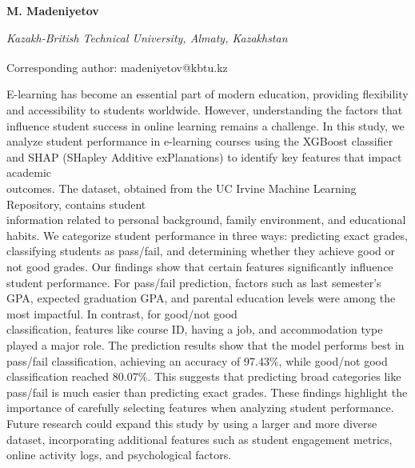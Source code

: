
\begin{articleheader}

{\bfseries
M. Madeniyetov
}
\end{articleheader}

\begin{affiliation}
\emph{Kazakh-British Technical University, Almaty, Kazakhstan}

\raggedright \textsuperscript{\envelope }Corresponding author: madeniyetov@kbtu.kz
\end{affiliation}

E-learning has become an essential part of modern education, providing
flexibility and accessibility to students worldwide. However,
understanding the factors that influence student success in online
learning remains a challenge. In this study, we analyze student
performance in e-learning courses using the XGBoost classifier and SHAP
(SHapley Additive exPlanations) to identify key features that impact
academic \\outcomes. The dataset, obtained from the UC Irvine Machine
Learning Repository, contains student \\information related to personal
background, family environment, and educational habits. We categorize
student performance in three ways: predicting exact grades, classifying
students as pass/fail, and determining whether they achieve good or not
good grades. Our findings show that certain features significantly
influence student performance. For pass/fail prediction, factors such as
last semester's GPA, expected graduation GPA, and parental education
levels were among the most impactful. In contrast, for good/not good\\
classification, features like course ID, having a job, and accommodation
type played a major role. The prediction results show that the model
performs best in pass/fail classification, achieving an accuracy of
97.43\%, while good/not good classification reached 80.07\%. This
suggests that predicting broad categories like pass/fail is much easier
than predicting exact grades. These findings highlight the importance of
carefully selecting features when analyzing student performance. Future
research could expand this study by using a larger and more diverse
dataset, incorporating additional features such as student engagement
metrics, online activity logs, and psychological factors.

